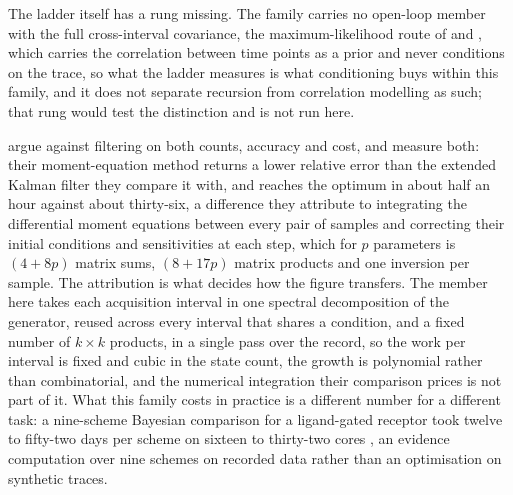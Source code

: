 \begin{appendixbox}
The ladder itself has a rung missing. The family carries no open-loop member with the full cross-interval covariance, the maximum-likelihood route of \citet{celentano2004use} and \citet{stepanyuk2011efficient}, which carries the correlation between time points as a prior and never conditions on the trace, so what the ladder measures is what conditioning buys within this family, and it does not separate recursion from correlation modelling as such; that rung would test the distinction and is not run here.

\citet{delcore2025parameter} argue against filtering on both counts, accuracy and cost, and measure both: their moment-equation method returns a lower relative error than the extended Kalman filter they compare it with, and reaches the optimum in about half an hour against about thirty-six, a difference they attribute to integrating the differential moment equations between every pair of samples and correcting their initial conditions and sensitivities at each step, which for $p$ parameters is $(4+8p)$ matrix sums, $(8+17p)$ matrix products and one inversion per sample. The attribution is what decides how the figure transfers. The member here takes each acquisition interval in one spectral decomposition of the generator, reused across every interval that shares a condition, and a fixed number of $k \times k$ products, in a single pass over the record, so the work per interval is fixed and cubic in the state count, the growth is polynomial rather than combinatorial, and the numerical integration their comparison prices is not part of it. What this family costs in practice is a different number for a different task: a nine-scheme Bayesian comparison for a ligand-gated receptor took twelve to fifty-two days per scheme on sixteen to thirty-two cores \citep{moffatt2025bayesian}, an evidence computation over nine schemes on recorded data rather than an optimisation on synthetic traces.

\end{appendixbox}

